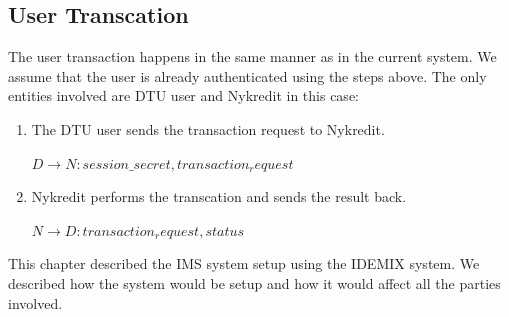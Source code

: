 \subsection{User Transcation}
The user transaction happens in the same manner as in the current system. We assume that the user is already authenticated using the steps above. The only entities involved are DTU user and Nykredit in this case:
\begin{enumerate}
\item The DTU user sends the transaction request to Nykredit.
	\begin{center}
		$D \rightarrow N : {session\_secret,transaction_request}$
	\end{center}
\item Nykredit performs the transcation and sends the result back.
	\begin{center}
		$N \rightarrow D : {transaction_request,status}$
	\end{center}
\end{enumerate}


This chapter described the IMS system setup using the IDEMIX system. We described how the system would be setup and how it would affect all the parties involved.


